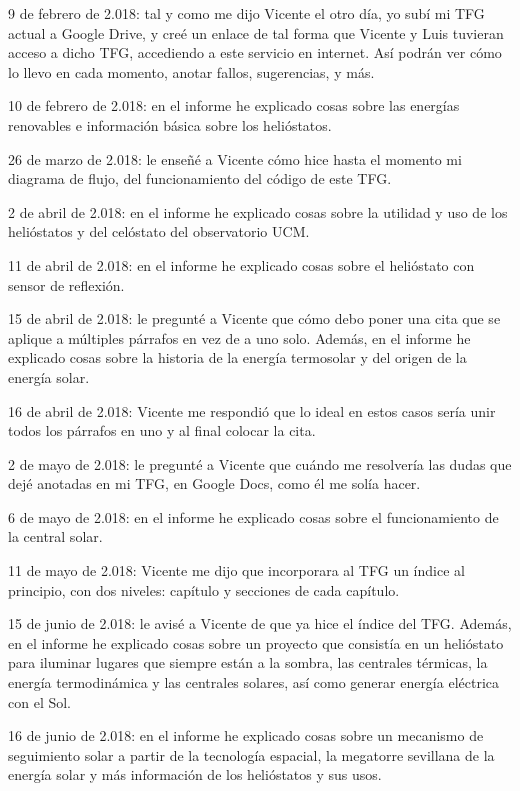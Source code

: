 9 de febrero de 2.018: tal y como me dijo Vicente el otro día, yo subí mi TFG actual a Google Drive, y creé un enlace de tal forma que Vicente y Luis tuvieran acceso a dicho TFG, accediendo a este servicio en internet. Así podrán ver cómo lo llevo en cada momento, anotar fallos, sugerencias, y más.

10 de febrero de 2.018: en el informe he explicado cosas sobre las energías renovables e información básica sobre los helióstatos.

26 de marzo de 2.018: le enseñé a Vicente cómo hice hasta el momento mi diagrama de flujo, del funcionamiento del código de este TFG.

2 de abril de 2.018: en el informe he explicado cosas sobre la utilidad y uso de los helióstatos y del celóstato del observatorio UCM.

11 de abril de 2.018: en el informe he explicado cosas sobre el helióstato con sensor de reflexión.

15 de abril de 2.018: le pregunté a Vicente que cómo debo poner una cita que se aplique a múltiples párrafos en vez de a uno solo. Además, en el informe he explicado cosas sobre la historia de la energía termosolar y del origen de la energía solar.

16 de abril de 2.018: Vicente me respondió que lo ideal en estos casos sería unir todos los párrafos en uno y al final colocar la cita.

2 de mayo de 2.018: le pregunté a Vicente que cuándo me resolvería las dudas que dejé anotadas en mi TFG, en Google Docs, como él me solía hacer.

6 de mayo de 2.018: en el informe he explicado cosas sobre el funcionamiento de la central solar.

11 de mayo de 2.018: Vicente me dijo que incorporara al TFG un índice al principio, con dos niveles: capítulo y secciones de cada capítulo.

15 de junio de 2.018: le avisé a Vicente de que ya hice el índice del TFG. Además, en el informe he explicado cosas sobre un proyecto que consistía en un helióstato para iluminar lugares que siempre están a la sombra, las centrales térmicas, la energía termodinámica y las centrales solares, así como generar energía eléctrica con el Sol.

16 de junio de 2.018: en el informe he explicado cosas sobre un mecanismo de seguimiento solar a partir de la tecnología espacial, la megatorre sevillana de la energía solar y más información de los helióstatos y sus usos.

